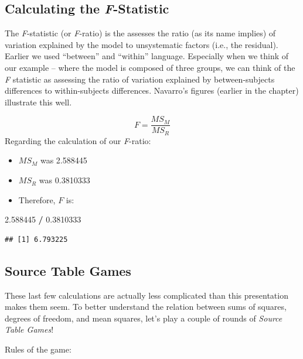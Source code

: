 \documentclass[
  english,
]{book}
\newenvironment{Shaded}{\begin{snugshade}}{\end{snugshade}}
\newcommand{\FloatTok}[1]{\textcolor[rgb]{0.00,0.00,0.81}{#1}}
\newcommand{\OperatorTok}[1]{\textcolor[rgb]{0.81,0.36,0.00}{\textbf{#1}}}
\newcommand{\StringTok}[1]{\textcolor[rgb]{0.31,0.60,0.02}{#1}}
\providecommand{\tightlist}{%
  \setlength{\itemsep}{0pt}\setlength{\parskip}{0pt}}
\begin{document}
\hypertarget{calculating-the-f-statistic}{%
\subsection{\texorpdfstring{Calculating the \emph{F}-Statistic}{Calculating the F-Statistic}}\label{calculating-the-f-statistic}}

The \emph{F}-statistic (or \emph{F}-ratio) is the assesses the ratio (as its name implies) of variation explained by the model to unsystematic factors (i.e., the residual). Earlier we used ``between'' and ``within'' language. Especially when we think of our example -- where the model is composed of three groups, we can think of the \emph{F} statistic as assessing the ratio of variation explained by between-subjects differences to within-subjects differences. Navarro's \citep{navarro_chapter_2020} figures (earlier in the chapter) illustrate this well.

\[F = \frac{MS_{M}}{MS_{R}}\]
Regarding the calculation of our \emph{F}-ratio:

\begin{itemize}
\tightlist
\item
  \(MS_M\) was 2.588445
\item
  \(MS_R\) was 0.3810333
\item
  Therefore, \(F\) is:
\end{itemize}

\begin{Shaded}
\begin{Highlighting}[]
\FloatTok{2.588445} \OperatorTok{/}\StringTok{ }\FloatTok{0.3810333}
\end{Highlighting}
\end{Shaded}

\begin{verbatim}
## [1] 6.793225
\end{verbatim}

\hypertarget{source-table-games}{%
\subsection{Source Table Games}\label{source-table-games}}

These last few calculations are actually less complicated than this presentation makes them seem. To better understand the relation between sums of squares, degrees of freedom, and mean squares, let's play a couple of rounds of \emph{Source Table Games}!

Rules of the game:
\end{document}
